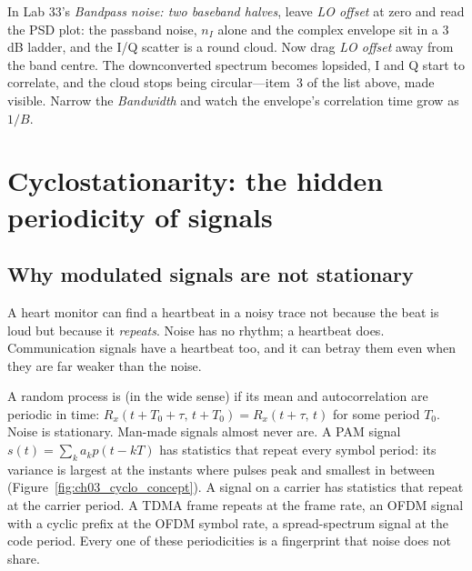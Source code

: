 \begin{tryit}
In Lab 33's \emph{Bandpass noise: two baseband halves}, leave \emph{LO offset} at zero and read the
PSD plot: the passband noise, $n_I$ alone and the complex envelope sit in a 3\,dB ladder, and the I/Q
scatter is a round cloud. Now drag \emph{LO offset} away from the band centre. The downconverted
spectrum becomes lopsided, I and Q start to correlate, and the cloud stops being circular---item~3 of
the list above, made visible. Narrow the \emph{Bandwidth} and watch the envelope's correlation time
grow as $1/B$.
\end{tryit}

\section{Cyclostationarity: the hidden periodicity of signals}
\label{sec:ch03:cyclo}


\subsection{Why modulated signals are not stationary}

A heart monitor can find a heartbeat in a noisy trace not because the beat is loud but because it
\emph{repeats}. Noise has no rhythm; a heartbeat does. Communication signals have a heartbeat too, and
it can betray them even when they are far weaker than the noise.

A random process is  (in the wide sense) if its mean and autocorrelation are
periodic in time: $R_x(t+T_0+\tau,\,t+T_0)=R_x(t+\tau,\,t)$ for some period $T_0$. Noise is
stationary. Man-made signals almost never are. A PAM signal $s(t)=\sum_ka_kp(t-kT)$ has statistics
that repeat every symbol period: its variance is largest at the instants where pulses peak and
smallest in between (Figure~\ref{fig:ch03_cyclo_concept}). A signal on a carrier has statistics that
repeat at the carrier period. A TDMA frame repeats at the frame rate, an OFDM signal with a cyclic
prefix at the OFDM symbol rate, a spread-spectrum signal at the code period. Every one of these
periodicities is a fingerprint that noise does not share.

